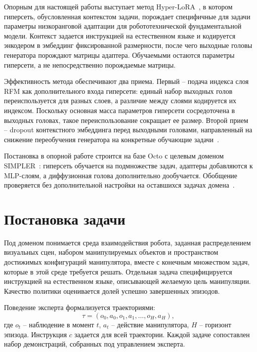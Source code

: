 \documentclass{misisarticle}
\begin{document}
Опорным для настоящей работы выступает метод Hyper-LoRA~\cite{hyperlora}, в котором гиперсеть, обусловленная контекстом задачи, порождает специфичные для задачи параметры низкоранговой адаптации для робототехнической фундаментальной модели. Контекст задается инструкцией на естественном языке и кодируется энкодером в эмбеддинг фиксированной размерности, после чего выходные головы генератора порождают матрицы адаптера. Обучаемыми остаются параметры гиперсети, а не непосредственно порождаемые матрицы.

Эффективность метода обеспечивают два приема. Первый -- подача индекса слоя RFM как дополнительного входа гиперсети: единый набор выходных голов переиспользуется для разных слоев, а различие между слоями кодируется их индексом. Поскольку основная масса параметров гиперсети сосредоточена в выходных головах, такое переиспользование сокращает ее размер. Второй прием -- dropout контекстного эмбеддинга перед выходными головами, направленный на снижение переобучения генератора на конкретные обучающие задачи~\cite{hyperlora}.

Постановка в опорной работе строится на базе Octo с целевым доменом SIMPLER~\cite{simpler}: гиперсеть обучается на подмножестве задач, адаптеры добавляются к MLP-слоям, а диффузионная голова дополнительно дообучается. Обобщение проверяется без дополнительной настройки на оставшихся задачах домена~\cite{hyperlora}.

\section{Постановка задачи}

Под доменом понимается среда взаимодействия робота, заданная распределением визуальных сцен, набором манипулируемых объектов и пространством достижимых конфигураций манипулятора, вместе с конечным множеством задач, которые в этой среде требуется решать. Отдельная задача специфицируется инструкцией на естественном языке, описывающей желаемую цель манипуляции. Качество политики оценивается долей успешно завершенных эпизодов.

Поведение эксперта формализуется траекториями:
\begin{equation}
  \tau=(o_0,a_0,o_1,a_1,\ldots,o_H,a_H),
\end{equation}
где $o_t$ -- наблюдение в момент $t$, $a_t$ -- действие манипулятора, $H$ -- горизонт эпизода. Инструкция $c$ задается для всей траектории. Каждой задаче сопоставлен набор демонстраций, собранных под управлением эксперта.
\end{document}
